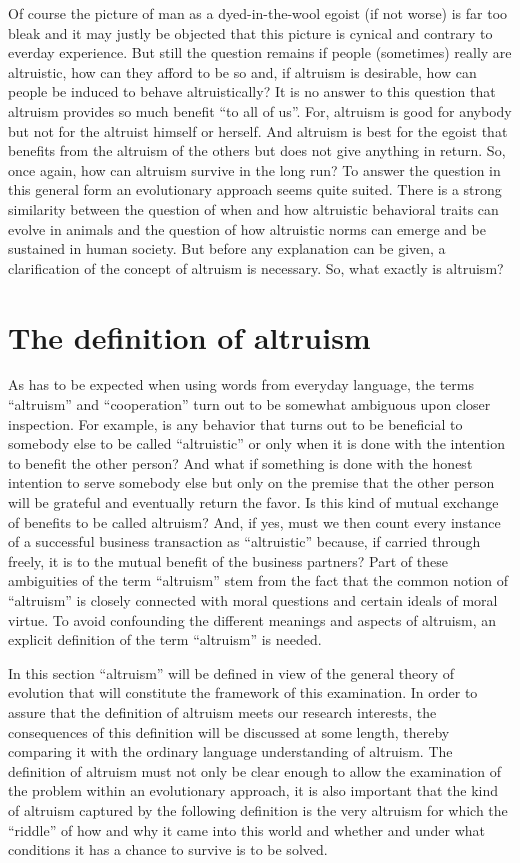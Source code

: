 Of course the picture of man as a dyed-in-the-wool egoist (if not worse) is
far too bleak and it may justly be objected that this picture is cynical and
contrary to everday experience.  But still the question remains if people
(sometimes) really are altruistic, how can they afford to be so and, if
altruism is desirable, how can people be induced to behave altruistically? It
is no answer to this question that altruism provides so much benefit ``to all
of us''. For, altruism is good for anybody but not for the altruist himself or
herself. And altruism is best for the egoist that benefits from the altruism
of the others but does not give anything in return. So, once again, how can
altruism survive in the long run? To answer the question in this general form
an evolutionary approach seems quite suited. There is a strong similarity
between the question of when and how altruistic behavioral traits can evolve
in animals and the question of how altruistic norms can emerge and be
sustained in human society. But before any explanation can be given, a
clarification of the concept of altruism is necessary. So, what exactly is
altruism?

\section{The definition of altruism}
\label{altruismDefinition}

As has to be expected when using words from everyday language, the terms
``altruism'' and ``cooperation'' turn out to be somewhat ambiguous upon closer
inspection. For example, is any behavior that turns out to be beneficial to
somebody else to be called ``altruistic'' or only when it is done with the
intention to benefit the other person? And what if something is done with the
honest intention to serve somebody else but only on the premise that the other
person will be grateful and eventually return the favor. Is this kind of
mutual exchange of benefits to be called altruism? And, if yes, must we then
count every instance of a successful business transaction as ``altruistic''
because, if carried through freely, it is to the mutual benefit of the
business partners? Part of these ambiguities of the term ``altruism'' stem
from the fact that the common notion of ``altruism'' is closely connected with
moral questions and certain ideals of moral virtue. To avoid confounding the
different meanings and aspects of altruism, an explicit definition of the term
``altruism'' is needed.

In this section ``altruism'' will be defined in view of the general theory of
evolution that will constitute the framework of this examination. In order to
assure that the definition of altruism meets our research interests, the
consequences of this definition will be discussed at some length, thereby
comparing it with the ordinary language understanding of altruism. The
definition of altruism must not only be clear enough to allow the examination
of the problem within an evolutionary approach, it is also important that the
kind of altruism captured by the following definition is the very altruism for
which the ``riddle'' of how and why it came into this world and whether and
under what conditions it has a chance to survive is to be solved.

